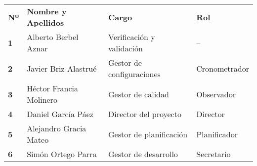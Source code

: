 \begin{longtable}{ | C{\tabcolsep} |
                     L{\tabcolsep} |
                     C{\tabcolsep} |
                     C{\tabcolsep} | }
\hline %
 \\
\hline %
{\bf Nº} & {\bf Nombre y Apellidos} & {\bf Cargo} & {\bf Rol} \\
\hline %
{\bf 1} & Alberto Berbel Aznar & Verificación y validación & --  \\
\hline %
{\bf 2} & Javier Briz Alastrué & Gestor de configuraciones & Cronometrador  \\
\hline %
{\bf 3} & Héctor Francia Molinero & Gestor de calidad & Observador  \\
\hline %
{\bf 4} & Daniel García Páez & Director del proyecto & Director \\
\hline %
{\bf 5} & Alejandro Gracia Mateo & Gestor de planificación & Planificador  \\
\hline %
{\bf 6} & Simón Ortego Parra & Gestor de desarrollo & Secretario  \\
\hline %
\end{longtable}

